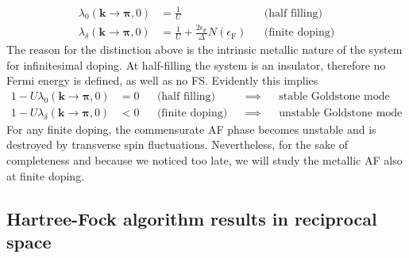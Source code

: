 \[
\begin{aligned}
	\lambda_0(\mathbf{k}\to\bm{\pi},0) &= \frac 1 U &&\text{(half filling)} \\
	\lambda_\delta(\mathbf{k}\to\bm{\pi},0) &= \frac 1 U + \frac{2\epsilon_\mathrm{F}}{\Delta} N(\epsilon_\mathrm{F}) &&\text{(finite doping)}
\end{aligned}
\]
The reason for the distinction above is the intrinsic metallic nature of the system for infinitesimal doping. At half-filling the system is an insulator, therefore no Fermi energy is defined, as well as no FS. Evidently this implies
\[
\begin{aligned}
	1 - U\lambda_0(\mathbf{k}\to\bm{\pi},0) &= 0 &&\text{(half filling)} &&\implies &&\text{stable Goldstone mode}\\
	1 - U\lambda_\delta(\mathbf{k}\to\bm{\pi},0) &< 0 &&\text{(finite doping)} &&\implies &&\text{unstable Goldstone mode}
\end{aligned}
\]
For any finite doping, the commensurate AF phase becomes unstable and is destroyed by transverse spin fluctuations. Nevertheless, for the sake of completeness and because we noticed too late, we will study the metallic AF also at finite doping.

\subsection{Hartree-Fock algorithm results in reciprocal space}\label{appsubsec:hartree-fock-algorithm}

